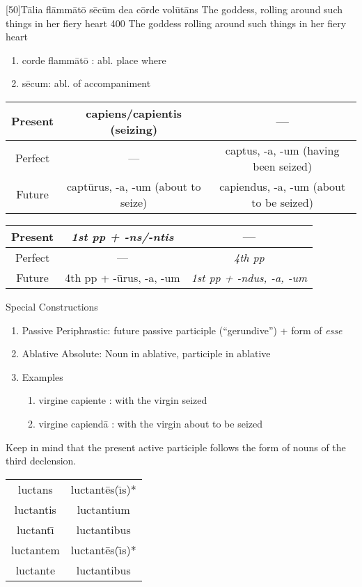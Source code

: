 \documentclass[]{book}
\begin{document}
\latline
  {[50]T\={\macron a}l\-i\-a fl\=amm\={\macron a}t\={\macron o} s\={\macron e}c\=um d\-e\-a c\=ord\-e v\-ol\={\macron u}t\={\macron a}ns
}
  { The goddess, rolling around such things in her fiery heart }
  {400}
  { The goddess rolling around such things in her fiery heart }
  { \begin{enumerate}
  	\item corde flamm\={a}t\={o} :  abl. place where
  	\item s\={e}cum:  abl. of accompaniment
  \end{enumerate} 

	\begin{tabular}{|c|c|c|}
	\hline
	Present & capiens/capientis (seizing)    & ---                 \\
	\hline                                                
	Perfect & ---                   & captus, -a, -um (having been seized)    \\
	\hline                                                
	Future  & capt\={u}rus, -a, -um (about to seize) & capiendus, -a, -um  (about to be seized)\\
	\hline
	\end{tabular}

  \vskip 2mm
	\begin{tabular}{|c|c|c|}	
	 \hline
	 Present &  \emph{1st pp + -ns/-ntis}  & ---\\
	 \hline    
	 Perfect &  ---                        & \emph{4th pp}\\
	 \hline    
	 Future  & 4th pp + -\={u}rus, -a, -um & \emph{1st pp + -ndus, -a, -um}\\
	 \hline
	\end{tabular}
		\vskip 2mm	
	Special Constructions
	\begin{enumerate}
		\item Passive Periphrastic:  future passive participle (``gerundive'') + form of \emph{esse}
		\item Ablative Absolute:  Noun in ablative, participle in ablative
		\item Examples
			\begin{enumerate}
				\item virgine capiente : with the virgin seized
				\item virgine capiend\={a} : with the virgin about to be seized
			\end{enumerate}
	\end{enumerate}
	
	Keep in mind that the present active participle follows the form of nouns of the third declension.  
	\vskip 2mm
	\begin{tabular}{|c|c|}
		\hline
		luctans       & luctant\={e}s(\={\i}s)*\\ 
		luctantis     & luctantium\\
		luctant\={\i} & luctantibus\\
		luctantem     & luctant\={e}s(\={\i}s)*\\
		luctante      & luctantibus\\
		\hline
	\end{tabular}

}
\end{document}
